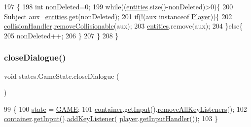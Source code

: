 \begin{DoxyCode}
197                                \{
198         \textcolor{keywordtype}{int} nonDeleted=0;
199         \textcolor{keywordflow}{while}((\mbox{\hyperlink{namespaceentities}{entities}}.size()-nonDeleted)>0)\{
200             Subject aux=\mbox{\hyperlink{namespaceentities}{entities}}.get(nonDeleted);
201             \textcolor{keywordflow}{if}(!(aux instanceof \mbox{\hyperlink{class_player}{Player}}))\{
202                 \mbox{\hyperlink{classstates_1_1_game_state_a7640e08453b2ce79066278d32d28ab63}{collisionHandler}}.\mbox{\hyperlink{classentities_1_1_collision_handler_a0634abfade22196f7c8292dca6d4c883}{removeCollisionable}}(aux);
203                 \mbox{\hyperlink{namespaceentities}{entities}}.remove(aux);
204             \}\textcolor{keywordflow}{else}\{
205                 nonDeleted++;
206             \}
207         \}
208     \}
\end{DoxyCode}
\mbox{\label{classstates_1_1_game_state_a68370a33c4250e3a8fe588e1ace01d85}} 
\subsubsection{\texorpdfstring{close\+Dialogue()}{closeDialogue()}}
{\footnotesize\ttfamily void states.\+Game\+State.\+close\+Dialogue (\begin{DoxyParamCaption}{ }\end{DoxyParamCaption})\hspace{0.3cm}{\ttfamily [inline]}}


\begin{DoxyCode}
99                                 \{
100         \mbox{\hyperlink{classstates_1_1_game_state_a5e07b1776e13d009e1a8c6a1e8140d04}{state}} = \mbox{\hyperlink{classstates_1_1_game_state_a8617f1d8be7bed020eeab9384e731bc6}{GAME}};
101         \mbox{\hyperlink{classstates_1_1_game_state_a88b0df4b57ada742c53e4e1ee3b25827}{container}}.\mbox{\hyperlink{classorg_1_1newdawn_1_1slick_1_1_game_container_a6042fd06c54872f9f791bd33beffec88}{getInput}}().\mbox{\hyperlink{classorg_1_1newdawn_1_1slick_1_1_input_ae9aa4789e13f1528ae603939684a4237}{removeAllKeyListeners}}();
102         \mbox{\hyperlink{classstates_1_1_game_state_a88b0df4b57ada742c53e4e1ee3b25827}{container}}.\mbox{\hyperlink{classorg_1_1newdawn_1_1slick_1_1_game_container_a6042fd06c54872f9f791bd33beffec88}{getInput}}().\mbox{\hyperlink{classorg_1_1newdawn_1_1slick_1_1_input_af5ad91bb375e8834e1914f441794561b}{addKeyListener}}(
      \mbox{\hyperlink{classstates_1_1_game_state_ae8ec891c55e1c5d43372a289d8a6d87e}{player}}.\mbox{\hyperlink{classentities_1_1_player_afddc465ed5f94a8137b90790e815ecea}{getInputHandler}}());
103     \}
\end{DoxyCode}
\mbox{\label{classstates_1_1_game_state_a7b673342f6dc74ba4c452ff346782d04}} 
